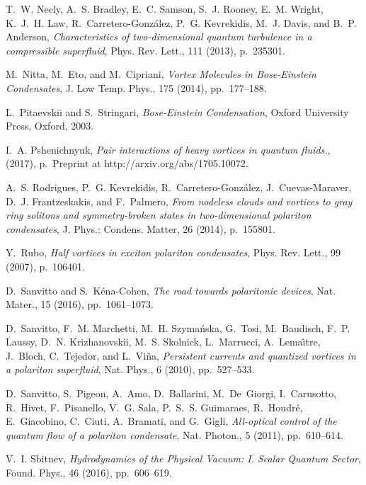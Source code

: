 \documentclass[aps,prb,twocolumn,superscriptaddress,nofootinbib]{revtex4}
\begin{document}
\begin{thebibliography}{10}
{\sc T.~W. Neely, A.~S. Bradley, E.~C. Samson, S.~J. Rooney, E.~M. Wright,
  K.~J.~H. Law, R.~Carretero-Gonz\'alez, P.~G. Kevrekidis, M.~J. Davis, and
  B.~P. Anderson}, {\em Characteristics of two-dimensional quantum turbulence
  in a compressible superfluid}, Phys. Rev. Lett., 111 (2013), p.~235301.

{\sc M.~Nitta, M.~Eto, and M.~Cipriani}, {\em Vortex {Molecules} in
  {Bose}-{Einstein} {Condensates}}, J. Low Temp. Phys., 175 (2014),
  pp.~177--188.

{\sc L.~Pitaevskii and S.~Stringari}, {\em Bose-Einstein Condensation}, Oxford
  University Press, Oxford, 2003.

{\sc I.~A. Pshenichnyuk}, {\em Pair interactions of heavy vortices in quantum
  fluids.},  (2017), p.~Preprint at http://arxiv.org/abs/1705.10072.

{\sc A.~S. Rodrigues, P.~G. Kevrekidis, R.~Carretero-Gonz\'{a}lez,
  J.~Cuevas-Maraver, D.~J. Frantzeskakis, and F.~Palmero}, {\em From nodeless
  clouds and vortices to gray ring solitons and symmetry-broken states in
  two-dimensional polariton condensates}, J. Phys.: Condens. Matter, 26 (2014),
  p.~155801.

{\sc Y.~Rubo}, {\em {Half vortices in exciton polariton condensates}}, Phys.
  Rev. Lett., 99 (2007), p.~106401.

{\sc D.~Sanvitto and S.~K\'{e}na-Cohen}, {\em The road towards polaritonic
  devices}, Nat. Mater., 15 (2016), pp.~1061--1073.

{\sc D.~Sanvitto, F.~M. Marchetti, M.~H. Szyma\'{n}ska, G.~Tosi, M.~Baudisch,
  F.~P. Laussy, D.~N. Krizhanovskii, M.~S. Skolnick, L.~Marrucci,
  A.~Lema\^{\i}tre, J.~Bloch, C.~Tejedor, and L.~Vi\~{n}a}, {\em {Persistent
  currents and quantized vortices in a polariton superfluid}}, Nat. Phys., 6
  (2010), pp.~527--533.

{\sc D.~Sanvitto, S.~Pigeon, A.~Amo, D.~Ballarini, M.~De~Giorgi, I.~Carusotto,
  R.~Hivet, F.~Pisanello, V.~G. Sala, P.~S.~S. Guimaraes, R.~Houdr\'e,
  E.~Giacobino, C.~Ciuti, A.~Bramati, and G.~Gigli}, {\em All-optical control
  of the quantum flow of a polariton condensate}, Nat. Photon., 5 (2011),
  pp.~610--614.

{\sc V.~I. Sbitnev}, {\em Hydrodynamics of the {Physical} {Vacuum}: {I}.
  {Scalar} {Quantum} {Sector}}, Found. Phys., 46 (2016), pp.~606--619.


\end{thebibliography}
\end{document}

